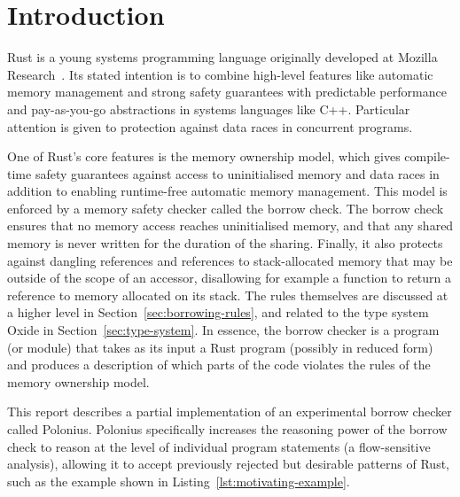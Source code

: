 \documentclass[11pt,a4paper,twoside,openany,draft]{report}
\newcommand{\fixme}[1] {{\color{red}#1}}
\begin{document}
\begingroup
  \tableofcontents
  \listoffigures
  \listoftables
\endgroup
  

\chapter{Introduction}

Rust is a young systems programming language originally developed at Mozilla
Research~\cite{matsakis_rust_2014}. Its stated intention is to combine
high-level features like automatic memory management and strong safety
guarantees with predictable performance and pay-as-you-go abstractions in
systems languages like C++. Particular attention is given to protection against
data races in concurrent programs.

One of Rust's core features is the memory ownership model, which gives
compile-time safety guarantees against access to uninitialised memory and data
races in addition to enabling runtime-free automatic memory management. This
model is enforced by a memory safety checker called the borrow check. The borrow
check ensures that no memory access reaches uninitialised memory, and that any
shared memory is never written for the duration of the sharing. Finally, it also
protects against dangling references and references to stack-allocated memory
that may be outside of the scope of an accessor, disallowing for example a
function to return a reference to memory allocated on its stack. The rules
themselves are discussed at a higher level in Section~\ref{sec:borrowing-rules},
and related to the type system Oxide in Section~\ref{sec:type-system}. In
essence, the borrow checker is a program (or module) that takes as its input a
Rust program (possibly in reduced form) and produces a description of which
parts of the code violates the rules of the memory ownership model.

This report describes a partial implementation of an experimental borrow checker
called Polonius. Polonius specifically increases the reasoning power of the
borrow check to reason at the level of individual program statements (a
flow-sensitive analysis), allowing it to accept previously rejected but
desirable patterns of Rust, such as the example shown in
Listing~\ref{lst:motivating-example}.
\end{document}
